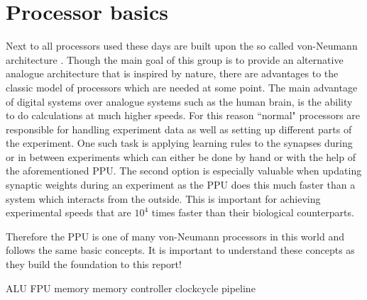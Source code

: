 \chapter{Processor basics}
\label{chapter:processor}

Next to all processors used these days are built upon the so called von-Neumann architecture .
Though the main goal of this group is to provide an alternative analogue architecture that is inspired by nature, there are advantages to the classic model of processors which are needed at some point.
The main advantage of digital systems over analogue systems such as the human brain, is the ability to do calculations at much higher speeds.
For this reason ``normal" processors are responsible for handling experiment data as well as setting up different parts of the experiment.
One such task is applying learning rules to the synapses during or in between experiments which can either be done by hand or with the help of the aforementioned PPU.
The second option is especially valuable when updating synaptic weights during an experiment as the PPU does this much faster than a system which interacts from the outside.
This is important for achieving experimental speeds that are $10^{4}$ times faster than their biological counterparts.

Therefore the PPU is one of many von-Neumann processors in this world and follows the same basic concepts.
It is important to understand these concepts as they build the foundation to this report!



ALU
FPU
memory
memory controller
clockcycle
pipeline

